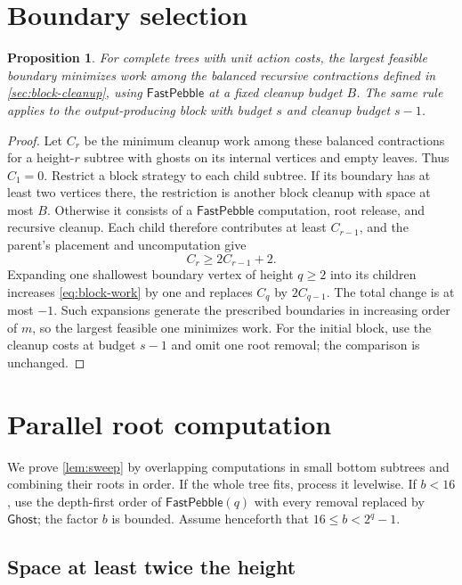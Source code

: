 \documentclass[11pt]{article}
\newtheorem{proposition}[proposition]{Proposition}
\theoremstyle{definition}
\theoremstyle{remark}
\newcommand{\Ghost}{\mathsf{Ghost}}
\newcommand{\Fast}{\mathsf{FastPebble}}
\begin{document}
\section{Boundary selection}
\label{app:sequential}

\begin{proposition}
\label{prop:greedy-boundary}
For complete trees with unit action costs, the largest feasible boundary minimizes work among the balanced recursive contractions defined in \cref{sec:block-cleanup}, using $\Fast$ at a fixed cleanup budget $B$. The same rule applies to the output-producing block with budget $s$ and cleanup budget $s-1$.
\end{proposition}
\begin{proof}
Let $C_r$ be the minimum cleanup work among these balanced contractions for a height-$r$ subtree with ghosts on its internal vertices and empty leaves. Thus $C_1=0$. Restrict a block strategy to each child subtree. If its boundary has at least two vertices there, the restriction is another block cleanup with space at most $B$. Otherwise it consists of a $\Fast$ computation, root release, and recursive cleanup. Each child therefore contributes at least $C_{r-1}$, and the parent's placement and uncomputation give
\[
 C_r\ge2C_{r-1}+2.
\]
Expanding one shallowest boundary vertex of height $q\ge2$ into its children increases \cref{eq:block-work} by one and replaces $C_q$ by $2C_{q-1}$. The total change is at most $-1$. Such expansions generate the prescribed boundaries in increasing order of $m$, so the largest feasible one minimizes work. For the initial block, use the cleanup costs at budget $s-1$ and omit one root removal; the comparison is unchanged.
\end{proof}

\section{Parallel root computation}
\label{app:sweep}

We prove \cref{lem:sweep} by overlapping computations in small bottom subtrees and combining their roots in order. If the whole tree fits, process it levelwise. If $b<16$, use the depth-first order of $\Fast(q)$ with every removal replaced by $\Ghost$; the factor $b$ is bounded. Assume henceforth that $16\le b<2^q-1$.

\subsection{Space at least twice the height}
\end{document}
